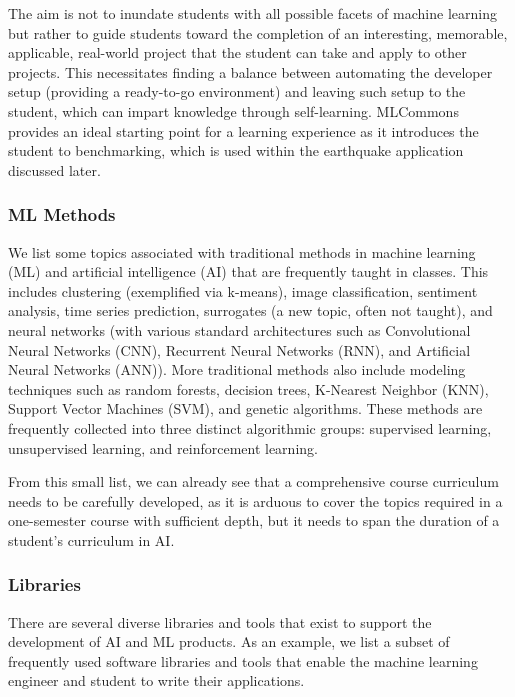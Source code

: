 The aim is not to inundate students with all possible facets of
machine learning but rather to guide students toward the completion 
of an interesting, memorable, applicable, real-world project
that the student can take and apply to other projects. This necessitates finding a balance between automating the developer setup (providing a ready-to-go environment) and leaving such setup to the student, which can impart knowledge through self-learning. MLCommons provides an ideal starting point for a learning experience as it introduces the student to benchmarking, which is used within the earthquake application discussed later.

\subsubsection{ML Methods}

We list some topics associated with traditional methods in machine learning (ML) and artificial intelligence (AI) that are frequently taught in classes. This includes clustering (exemplified via k-means), image classification, sentiment analysis, time series prediction, surrogates (a new topic, often not taught), and neural networks (with various standard architectures such as Convolutional Neural Networks (CNN), Recurrent Neural Networks (RNN), and Artificial Neural Networks (ANN)). More traditional methods also include modeling techniques such as random forests, decision trees, K-Nearest Neighbor (KNN), Support Vector Machines (SVM), and genetic algorithms. These methods are frequently collected into three distinct algorithmic groups: supervised learning, unsupervised learning, and reinforcement learning.

From this small list, we can already see that a comprehensive course curriculum needs to be carefully developed, as it is arduous to cover the topics required in a one-semester course with sufficient depth, but it needs to span the duration of a student's curriculum in AI.

\subsubsection{Libraries}

There are several diverse libraries and tools that exist to support the development of AI and ML products. As an example, we list a subset of frequently used software libraries and tools that enable the machine learning engineer and student to write their applications.

